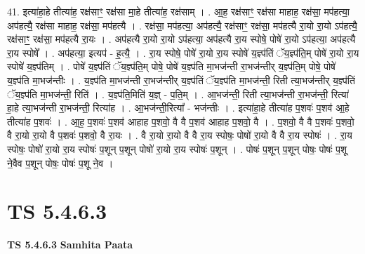 \documentclass[17pt]{extarticle}
\begin{document}
41. इत्या॑हा॒हे तीत्या॑ह॒ रक्ष॑साꣳ॒॒ रक्ष॑सा मा॒हे तीत्या॑ह॒ रक्ष॑साम् । . आ॒ह॒ रक्ष॑साꣳ॒॒ रक्ष॑सा माहाह॒ रक्ष॑सा॒ मप॑हत्या॒ अप॑हत्यै॒ रक्ष॑सा माहाह॒ रक्ष॑सा॒ मप॑हत्यै । . रक्ष॑सा॒ मप॑हत्या॒ अप॑हत्यै॒ रक्ष॑साꣳ॒॒ रक्ष॑सा॒ मप॑हत्यै रा॒यो रा॒यो ऽप॑हत्यै॒ रक्ष॑साꣳ॒॒ रक्ष॑सा॒ मप॑हत्यै रा॒यः । . अप॑हत्यै रा॒यो रा॒यो ऽप॑हत्या॒ अप॑हत्यै रा॒य स्पोषे॒ पोषे॑ रा॒यो ऽप॑हत्या॒ अप॑हत्यै रा॒य स्पोषे᳚ । . अप॑हत्या॒ इत्यप॑ - ह॒त्यै॒ । . रा॒य स्पोषे॒ पोषे॑ रा॒यो रा॒य स्पोषे॑ य॒ज्ञ्प॑तिं ॅय॒ज्ञ्प॑ति॒म् पोषे॑ रा॒यो रा॒य स्पोषे॑ य॒ज्ञ्प॑तिम् । . पोषे॑ य॒ज्ञ्प॑तिं ॅय॒ज्ञ्प॑ति॒म् पोषे॒ पोषे॑ य॒ज्ञ्प॑ति मा॒भज॑न्ती रा॒भज॑न्तीर् य॒ज्ञ्प॑ति॒म् पोषे॒ पोषे॑ य॒ज्ञ्प॑ति मा॒भज॑न्तीः । . य॒ज्ञ्प॑ति मा॒भज॑न्ती रा॒भज॑न्तीर् य॒ज्ञ्प॑तिं ॅय॒ज्ञ्प॑ति मा॒भज॑न्ती॒ रिती त्या॒भज॑न्तीर् य॒ज्ञ्प॑तिं ॅय॒ज्ञ्प॑ति मा॒भज॑न्ती॒ रिति॑ । . य॒ज्ञ्प॑ति॒मिति॑ य॒ज्ञ् - प॒ति॒म् । . आ॒भज॑न्ती॒ रिती त्या॒भज॑न्ती रा॒भज॑न्ती॒ रित्या॑ हा॒हे त्या॒भज॑न्ती रा॒भज॑न्ती॒ रित्या॑ह । . आ॒भज॑न्ती॒रित्या᳚ - भज॑न्तीः । . इत्या॑हा॒हे तीत्या॑ह प॒शवः॑ प॒शव॑ आ॒हे तीत्या॑ह प॒शवः॑ । . आ॒ह॒ प॒शवः॑ प॒शव॑ आहाह प॒शवो॒ वै वै प॒शव॑ आहाह प॒शवो॒ वै । . प॒शवो॒ वै वै प॒शवः॑ प॒शवो॒ वै रा॒यो रा॒यो वै प॒शवः॑ प॒शवो॒ वै रा॒यः । . वै रा॒यो रा॒यो वै वै रा॒य स्पोषः॒ पोषो॑ रा॒यो वै वै रा॒य स्पोषः॑ । . रा॒य स्पोषः॒ पोषो॑ रा॒यो रा॒य स्पोषः॑ प॒शून् प॒शून् पोषो॑ रा॒यो रा॒य स्पोषः॑ प॒शून् । . पोषः॑ प॒शून् प॒शून् पोषः॒ पोषः॑ प॒शू ने॒वैव प॒शून् पोषः॒ पोषः॑ प॒शू ने॒व । \newline
\pagebreak
{}

\section{ TS 5.4.6.3 }

\textbf{TS 5.4.6.3 } \newline
\textbf{Samhita Paata} \newline
\end{document}
